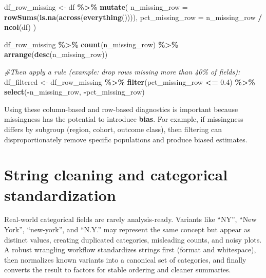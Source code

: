 \documentclass[
  11pt,
]{article}
\newenvironment{Shaded}{\begin{snugshade}}{\end{snugshade}}
\newcommand{\AttributeTok}[1]{\textcolor[rgb]{0.13,0.29,0.53}{#1}}
\newcommand{\CommentTok}[1]{\textcolor[rgb]{0.56,0.35,0.01}{\textit{#1}}}
\newcommand{\FloatTok}[1]{\textcolor[rgb]{0.00,0.00,0.81}{#1}}
\newcommand{\FunctionTok}[1]{\textcolor[rgb]{0.13,0.29,0.53}{\textbf{#1}}}
\newcommand{\NormalTok}[1]{#1}
\newcommand{\OtherTok}[1]{\textcolor[rgb]{0.56,0.35,0.01}{#1}}
\newcommand{\SpecialCharTok}[1]{\textcolor[rgb]{0.81,0.36,0.00}{\textbf{#1}}}
\begin{document}
\begin{Shaded}
\begin{Highlighting}[]
\NormalTok{df\_row\_missing }\OtherTok{\textless{}{-}}\NormalTok{ df }\SpecialCharTok{\%\textgreater{}\%}
  \FunctionTok{mutate}\NormalTok{(}
    \AttributeTok{n\_missing\_row =} \FunctionTok{rowSums}\NormalTok{(}\FunctionTok{is.na}\NormalTok{(}\FunctionTok{across}\NormalTok{(}\FunctionTok{everything}\NormalTok{()))),}
    \AttributeTok{pct\_missing\_row =}\NormalTok{ n\_missing\_row }\SpecialCharTok{/} \FunctionTok{ncol}\NormalTok{(df)}
\NormalTok{  )}

\NormalTok{df\_row\_missing }\SpecialCharTok{\%\textgreater{}\%}
  \FunctionTok{count}\NormalTok{(n\_missing\_row) }\SpecialCharTok{\%\textgreater{}\%}
  \FunctionTok{arrange}\NormalTok{(}\FunctionTok{desc}\NormalTok{(n\_missing\_row))}

\CommentTok{\#Then apply a rule (example: drop rows missing more than 40\% of fields):}
\NormalTok{df\_filtered }\OtherTok{\textless{}{-}}\NormalTok{ df\_row\_missing }\SpecialCharTok{\%\textgreater{}\%}
  \FunctionTok{filter}\NormalTok{(pct\_missing\_row }\SpecialCharTok{\textless{}=} \FloatTok{0.4}\NormalTok{) }\SpecialCharTok{\%\textgreater{}\%}
  \FunctionTok{select}\NormalTok{(}\SpecialCharTok{{-}}\NormalTok{n\_missing\_row, }\SpecialCharTok{{-}}\NormalTok{pct\_missing\_row)}
\end{Highlighting}
\end{Shaded}

Using these column-based and row-based diagnostics is important because
missingness has the potential to introduce \textbf{bias}. For example,
if missingness differs by subgroup (region, cohort, outcome class), then
filtering can disproportionately remove specific populations and produce
biased estimates.

\section{String cleaning and categorical
standardization}\label{string-cleaning-and-categorical-standardization}

Real-world categorical fields are rarely analysis-ready. Variants like
``NY'', ``New York'', ``new-york'', and ``N.Y.'' may represent the same
concept but appear as distinct values, creating duplicated categories,
misleading counts, and noisy plots. A robust wrangling workflow
standardizes strings first (format and whitespace), then normalizes
known variants into a canonical set of categories, and finally converts
the result to factors for stable ordering and cleaner summaries.
\end{document}
